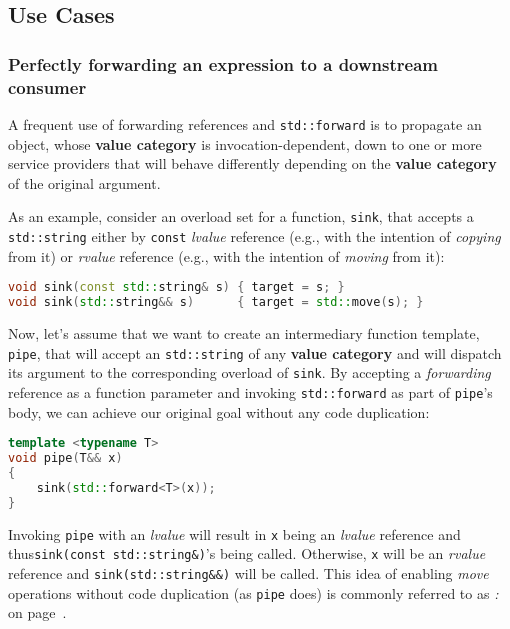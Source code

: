 \subsection[Use Cases]{Use Cases}\label{use-cases-forwardingref}

\subsubsection[Perfectly forwarding an expression to a downstream consumer]{Perfectly forwarding an expression to a downstream consumer}\label{perfectly-forwarding-an-expression-to-a-downstream-consumer}

A frequent use of forwarding references and \texttt{std::forward} is to
propagate an object, whose \textbf{value category} is
invocation-dependent, down to one or more service providers that will
behave differently depending on the \textbf{value category} of the
original argument.

As an example, consider an overload set for a function, \texttt{sink},
that accepts a \texttt{std::string} either by \texttt{const}
\emph{lvalue} reference (e.g., with the intention of \textit{copying} from it) or
\emph{rvalue} reference (e.g., with the intention of \textit{moving} from it):

\begin{lstlisting}[language=C++]
void sink(const std::string& s) { target = s; }
void sink(std::string&& s)      { target = std::move(s); }
\end{lstlisting}
    
\noindent Now, let's assume that we want to create an intermediary function
template, \texttt{pipe}, that will accept an \texttt{std::string} of any
\textbf{value category} and will dispatch its argument to the
corresponding overload of \texttt{sink}. By accepting a
\emph{forwarding} reference as a function parameter and invoking
\texttt{std::forward} as part of \texttt{pipe}'s body, we can achieve
our original goal without any code duplication:

\begin{lstlisting}[language=C++]
template <typename T>
void pipe(T&& x)
{
    sink(std::forward<T>(x));
}
\end{lstlisting}
    
\noindent Invoking \texttt{pipe} with an \emph{lvalue} will result in \texttt{x}
being an \emph{lvalue} reference and thus\linebreak[4]%
\mbox{\texttt{sink(const}~\texttt{std::string\&)}'s} being called. Otherwise,
\texttt{x} will be an \emph{rvalue} reference and
\texttt{sink(std::string\&\&)} will be called. This idea of enabling
\emph{move} operations without code duplication (as \texttt{pipe} does)
is commonly referred to as \textit{: } on page~\pageref{perfect-forwarding-for-generic-factory-functions}. 

